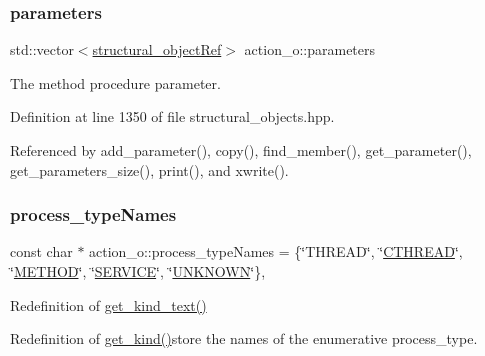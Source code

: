 \subsubsection{\texorpdfstring{parameters}{parameters}}
{\footnotesize\ttfamily std\+::vector$<$\hyperlink{structural__objects_8hpp_a8ea5f8cc50ab8f4c31e2751074ff60b2}{structural\+\_\+object\+Ref}$>$ action\+\_\+o\+::parameters\hspace{0.3cm}{\ttfamily [private]}}



The method procedure parameter. 



Definition at line 1350 of file structural\+\_\+objects.\+hpp.



Referenced by add\+\_\+parameter(), copy(), find\+\_\+member(), get\+\_\+parameter(), get\+\_\+parameters\+\_\+size(), print(), and xwrite().

\mbox{\label{classaction__o_a62a74b3315f2acaf3aace6c2e093b2f5}} 
\subsubsection{\texorpdfstring{process\+\_\+type\+Names}{process\_typeNames}}
{\footnotesize\ttfamily const char $\ast$ action\+\_\+o\+::process\+\_\+type\+Names = \{\char`\"{}T\+H\+R\+E\+AD\char`\"{}, \char`\"{}\hyperlink{classaction__o_a72fdfe1ad9ac24109fe11bb41153b87ba854bd867c7b7d6c4a1cb0e8adf8c8ea1}{C\+T\+H\+R\+E\+AD}\char`\"{}, \char`\"{}\hyperlink{classaction__o_a72fdfe1ad9ac24109fe11bb41153b87baed1ba72c47b31235949577b6ce1a2980}{M\+E\+T\+H\+OD}\char`\"{}, \char`\"{}\hyperlink{classaction__o_a72fdfe1ad9ac24109fe11bb41153b87baec4636f8fb033c67560934b1af7dbed8}{S\+E\+R\+V\+I\+CE}\char`\"{}, \char`\"{}\hyperlink{classaction__o_a72fdfe1ad9ac24109fe11bb41153b87ba13f0a6af19f8554b270706ba9f27c690}{U\+N\+K\+N\+O\+WN}\char`\"{}\}\hspace{0.3cm}{\ttfamily [static]}, {\ttfamily [private]}}



Redefinition of \hyperlink{classstructural__object_a36c541b52425c4de8fa45d79285a97e7}{get\+\_\+kind\+\_\+text()} 

Redefinition of \hyperlink{classstructural__object_ad9f487c3b7774ecd4e2f55979c434cd0}{get\+\_\+kind()}store the names of the enumerative process\+\_\+type. 

